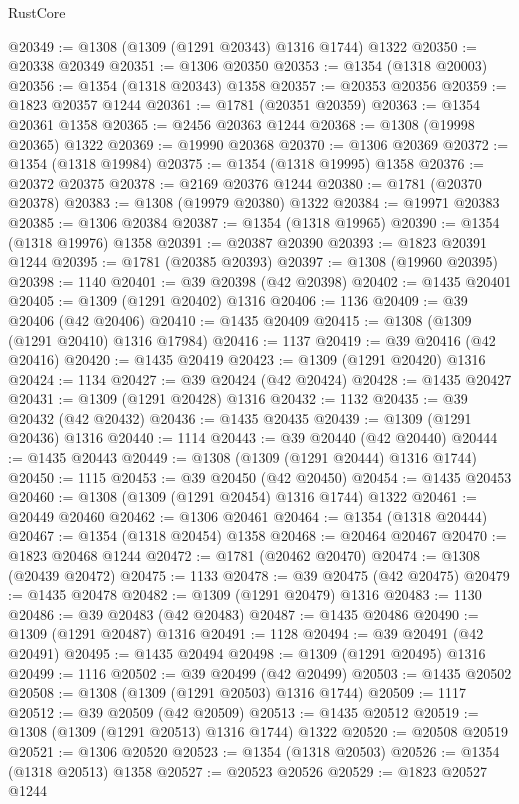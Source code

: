 \begin{lexlean}{RustCore}
\begin{coremodule}
@20349 := @1308 (@1309 (@1291 @20343) @1316 @1744) @1322
@20350 := @20338 @20349
@20351 := @1306 @20350
@20353 := @1354 (@1318 @20003)
@20356 := @1354 (@1318 @20343) @1358
@20357 := @20353 @20356
@20359 := @1823 @20357 @1244
@20361 := @1781 (@20351 @20359)
@20363 := @1354 @20361 @1358
@20365 := @2456 @20363 @1244
@20368 := @1308 (@19998 @20365) @1322
@20369 := @19990 @20368
@20370 := @1306 @20369
@20372 := @1354 (@1318 @19984)
@20375 := @1354 (@1318 @19995) @1358
@20376 := @20372 @20375
@20378 := @2169 @20376 @1244
@20380 := @1781 (@20370 @20378)
@20383 := @1308 (@19979 @20380) @1322
@20384 := @19971 @20383
@20385 := @1306 @20384
@20387 := @1354 (@1318 @19965)
@20390 := @1354 (@1318 @19976) @1358
@20391 := @20387 @20390
@20393 := @1823 @20391 @1244
@20395 := @1781 (@20385 @20393)
@20397 := @1308 (@19960 @20395)
@20398 := 1140
@20401 := @39 @20398 (@42 @20398)
@20402 := @1435 @20401
@20405 := @1309 (@1291 @20402) @1316
@20406 := 1136
@20409 := @39 @20406 (@42 @20406)
@20410 := @1435 @20409
@20415 := @1308 (@1309 (@1291 @20410) @1316 @17984)
@20416 := 1137
@20419 := @39 @20416 (@42 @20416)
@20420 := @1435 @20419
@20423 := @1309 (@1291 @20420) @1316
@20424 := 1134
@20427 := @39 @20424 (@42 @20424)
@20428 := @1435 @20427
@20431 := @1309 (@1291 @20428) @1316
@20432 := 1132
@20435 := @39 @20432 (@42 @20432)
@20436 := @1435 @20435
@20439 := @1309 (@1291 @20436) @1316
@20440 := 1114
@20443 := @39 @20440 (@42 @20440)
@20444 := @1435 @20443
@20449 := @1308 (@1309 (@1291 @20444) @1316 @1744)
@20450 := 1115
@20453 := @39 @20450 (@42 @20450)
@20454 := @1435 @20453
@20460 := @1308 (@1309 (@1291 @20454) @1316 @1744) @1322
@20461 := @20449 @20460
@20462 := @1306 @20461
@20464 := @1354 (@1318 @20444)
@20467 := @1354 (@1318 @20454) @1358
@20468 := @20464 @20467
@20470 := @1823 @20468 @1244
@20472 := @1781 (@20462 @20470)
@20474 := @1308 (@20439 @20472)
@20475 := 1133
@20478 := @39 @20475 (@42 @20475)
@20479 := @1435 @20478
@20482 := @1309 (@1291 @20479) @1316
@20483 := 1130
@20486 := @39 @20483 (@42 @20483)
@20487 := @1435 @20486
@20490 := @1309 (@1291 @20487) @1316
@20491 := 1128
@20494 := @39 @20491 (@42 @20491)
@20495 := @1435 @20494
@20498 := @1309 (@1291 @20495) @1316
@20499 := 1116
@20502 := @39 @20499 (@42 @20499)
@20503 := @1435 @20502
@20508 := @1308 (@1309 (@1291 @20503) @1316 @1744)
@20509 := 1117
@20512 := @39 @20509 (@42 @20509)
@20513 := @1435 @20512
@20519 := @1308 (@1309 (@1291 @20513) @1316 @1744) @1322
@20520 := @20508 @20519
@20521 := @1306 @20520
@20523 := @1354 (@1318 @20503)
@20526 := @1354 (@1318 @20513) @1358
@20527 := @20523 @20526
@20529 := @1823 @20527 @1244

\end{coremodule}
\end{lexlean}
